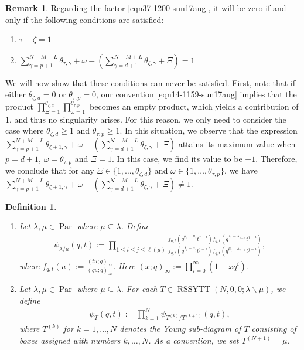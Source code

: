 \documentclass[12pt,reqno,a4paper]{amsart}
\numberwithin{equation}{section}
\newtheorem{dfn}[thm]{Definition}
\theoremstyle{definition}
\newtheorem{rem}[thm]{Remark}
\begin{document}
\begin{rem}
Regarding the factor \eqref{eqn37-1200-sun17aug}, it will be zero if and only if the following conditions are satisfied:
\begin{enumerate}[(1)]
\item $\tau - \zeta = 1$
\item $\sum_{\gamma = p + 1}^{N + M + L} \theta_{\tau,\gamma}	+ \omega	- (\sum_{\gamma = d + 1}^{N + M + L} \theta_{\zeta,\gamma} + \Xi)	 = 1$
\end{enumerate}
We will now show that these conditions can never be satisfied. First, note that if either $\theta_{\zeta,d} = 0$ or
$\theta_{\tau,p} = 0$, our convention \eqref{eqn14-1159-sun17aug} implies that the product 
$\prod_{\Xi = 1}^{\theta_{\zeta,d}}\prod_{\omega = 1}^{\theta_{\tau,p}}$ becomes an empty product, which yields a contribution of $1$, and thus no singularity arises. For this reason, we only need to consider the case where $\theta_{\zeta,d} \geq 1$ and $\theta_{\tau,p} \geq 1$. In this situation, we observe that the expression 
$\sum_{\gamma = p + 1}^{N + M + L} \theta_{\zeta + 1,\gamma}	+ \omega	- (\sum_{\gamma = d + 1}^{N + M + L} \theta_{\zeta,\gamma} + \Xi)$
attains its maximum value when $p = d+1$, $\omega = \theta_{\tau,p}$ and $\Xi = 1$. In this case, we find its value to be $-1$. Therefore, we conclude that for any $\Xi \in \{1,\dots,\theta_{\zeta,d}\}$ and $\omega \in \{1,\dots,\theta_{\tau,p}\}$, we have 
$\sum_{\gamma = p + 1}^{N + M + L} \theta_{\zeta + 1,\gamma}	+ \omega	- (\sum_{\gamma = d + 1}^{N + M + L} \theta_{\zeta,\gamma} + \Xi) \neq 1$. 
\end{rem}

\begin{dfn}\mbox{}
\label{dfn214-2113-26jul}
\begin{enumerate}[(1)]
\item Let $\lambda, \mu \in \operatorname{Par}$ where $\mu \subseteq \lambda$. Define 
\begin{align}
	\psi_{\lambda/\mu}(q,t) := \prod_{1 \leq i \leq j \leq \ell(\mu)}
	\frac{
		f_{q,t}(q^{\mu_i - \mu_j}t^{j - i})
		f_{q,t}(q^{\lambda_i - \lambda_{j+1}}t^{j - i})
	}{
		f_{q,t}(q^{\lambda_i - \mu_j}t^{j - i})
		f_{q,t}(q^{\mu_i - \lambda_{j+1}}t^{j - i})
	}, 
	\label{eqn27-2052}
\end{align}
where $\displaystyle f_{q,t}(u) := \frac{(tu;q)_\infty}{(qu;q)_\infty}$. Here $(x;q)_\infty := \prod_{i = 0}^{\infty}(1 - xq^i)$. 
\vspace{0.2cm}
\item Let $\lambda, \mu \in \operatorname{Par}$ where $\mu \subseteq \lambda$.  For each $T \in \operatorname{RSSYTT}(N,0,0;\lambda\backslash \mu)$, we define 
\begin{align}
	\psi_{T}(q,t) := \prod_{k = 1}^{N}\psi_{T^{(k)}/T^{(k+1)}}(q,t), 
\end{align}
where $T^{(k)}$ for $k = 1,\dots,N$ denotes the Young sub-diagram of $T$ consisting of boxes assigned with numbers $k,\dots,N$. As a convention, we set $T^{(N+1)} = \mu$. 
\end{enumerate}
\end{dfn}
\end{document}
